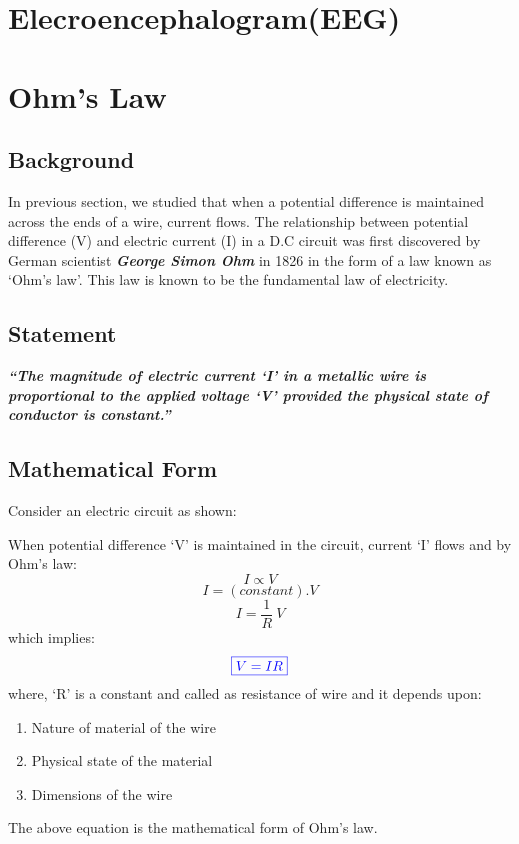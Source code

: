 \section{Elecroencephalogram(EEG)}
\section{Ohm's Law}
\subsection*{Background}
In previous section, we studied that when a potential difference is maintained across the ends of a wire, current flows. The relationship between potential difference (V) and electric current (I) in a D.C circuit was first discovered by German scientist \textit{\textbf{George Simon Ohm}} in 1826 in the form of a law known as ‘Ohm’s law’. This law is known to be the fundamental law of electricity.
\subsection*{Statement}
\textit{\textbf{“The magnitude of electric current ‘I’ in a metallic wire is proportional to the applied voltage `V' provided the physical state of conductor is constant.”}}
\subsection*{Mathematical Form}
Consider an electric circuit as shown:

When potential difference ‘V’ is maintained in the circuit, current ‘I’ flows and by Ohm’s law:
\begin{equation}
 I \propto V \nonumber
\end{equation}
\begin{equation}
    I = (constant).V \nonumber
\end{equation}
\begin{equation}
    I = \frac{1}{R}\: V \nonumber
\end{equation}
which implies:
\begin{equation}\label{eq:12.5}
\color{blue}\boxed{V = IR}
\end{equation}
where, `R’ is a constant and called as resistance of wire and it depends upon:
\begin{enumerate}[label=(\roman*)] 
\item Nature of material of the wire
\item Physical state of the material
\item Dimensions of the wire
\end{enumerate}
 The above equation is the mathematical form of Ohm’s law.

